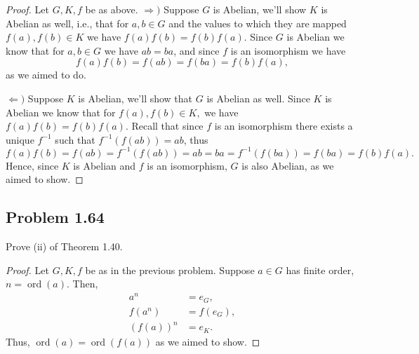 \documentclass{amsbook}
\DeclareMathOperator{\ord}{\text{ord}}
\begin{document}
			\begin{proof} Let $G,K,f$ be as above.
			$\Rightarrow)$ Suppose $G$ is Abelian, we'll show $K$ is Abelian as well, i.e., that for $a,b \in G$ and the values to which they are mapped $f(a),f(b) \in K$ we have $f(a)f(b) = f(b)f(a)$.
			Since $G$ is Abelian we know that for $a,b \in G$ we have $ab = ba$, and since $f$ is an isomorphism we have $$f(a)f(b) = f(ab) = f(ba) = f(b)f(a),$$ as we aimed to do.

			$\Leftarrow)$ Suppose $K$ is Abelian, we'll show that $G$ is Abelian as well.
			Since $K$ is Abelian we know that for $f(a),f(b) \in K,$ we have $f(a)f(b) = f(b)f(a)$.
			Recall that since $f$ is an isomorphism there exists a unique $f^{-1}$ such that $f^{-1}\left( f(ab) \right) = ab$, thus $$f(a)f(b) = f(ab) = f^{-1}\left( f(ab) \right) = ab = ba = f^{-1}\left( f(ba) \right) = f(ba) = f(b)f(a).$$
			Hence, since $K$ is Abelian and $f$ is an isomorphism, $G$ is also Abelian, as we aimed to show.
			\end{proof}

			\subsection*{Problem 1.64}
			\label{sub:problem_1_64}
			Prove (ii) of Theorem 1.40.
			\begin{proof} Let $G,K,f$ be as in the previous problem.
			Suppose $a \in G$ has finite order, $n = \ord(a)$.
			Then,
			\begin{align*}
				a^{n} &= e_{G}, \\
				f(a^{n}) &= f(e_{G}), \\
				\left( f(a) \right)^{n} &= e_{K}.
			\end{align*}
			Thus, $\ord(a) = \ord\left( f(a) \right)$ as we aimed to show.
			
			\end{proof}
\end{document}
